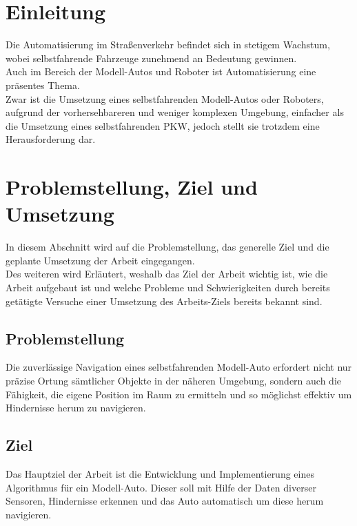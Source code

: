 \section{Einleitung}
Die Automatisierung im Straßenverkehr befindet sich in stetigem Wachstum, wobei selbstfahrende Fahrzeuge zunehmend an Bedeutung gewinnen. \\
Auch im Bereich der Modell-Autos und Roboter ist Automatisierung eine präsentes Thema. \\
Zwar ist die Umsetzung eines selbstfahrenden Modell-Autos oder Roboters, aufgrund der vorhersehbareren und weniger komplexen Umgebung, einfacher als die Umsetzung eines selbstfahrenden PKW, jedoch stellt sie trotzdem eine Herausforderung dar.

\section{Problemstellung, Ziel und Umsetzung}
In diesem Abschnitt wird auf die Problemstellung, das generelle Ziel und die geplante Umsetzung der Arbeit eingegangen. \\
Des weiteren wird Erläutert, weshalb das Ziel der Arbeit wichtig ist, wie die Arbeit aufgebaut ist und welche Probleme und Schwierigkeiten durch bereits getätigte Versuche einer Umsetzung des Arbeits-Ziels bereits bekannt sind.

\subsection{Problemstellung}
Die zuverlässige Navigation eines selbstfahrenden Modell-Auto erfordert nicht nur präzise Ortung sämtlicher Objekte in der näheren Umgebung, sondern auch die Fähigkeit, die eigene Position im Raum zu ermitteln und so möglichst effektiv um Hindernisse herum zu navigieren. \\



\subsection{Ziel}
Das Hauptziel der Arbeit ist die Entwicklung und Implementierung eines Algorithmus für ein Modell-Auto. Dieser soll mit Hilfe der Daten diverser Sensoren, Hindernisse
erkennen und das Auto automatisch um diese herum navigieren. \\


